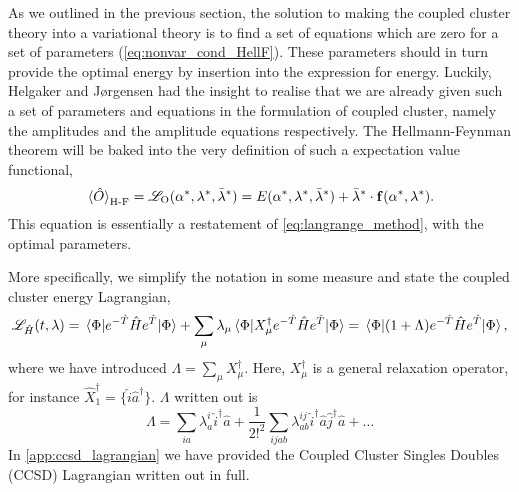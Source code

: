 As we outlined in the previous section, the solution to making the coupled cluster 
theory into a variational theory is to find a set of equations which are zero for a set
of parameters (\autoref{eq:nonvar_cond_HellF}). These parameters should in turn provide the optimal energy by insertion 
into the expression for energy. Luckily, Helgaker and 
Jørgensen\cite{helgaker1988analytical,helgaker1989configuration} had the insight to 
realise that we are already given such a set of parameters and equations in the 
formulation of coupled cluster, namely the amplitudes and the amplitude equations
respectively. The Hellmann-Feynman theorem will be baked into the very definition 
of such a expectation value functional,
\begin{equation}
    \ev*{\hat{O}}_{\text{H-F}} 
        = \mathscr{L}_{\text{O}}(\alpha^*, \vb{\lambda}^*, \bar{\vb{\lambda}}^*)
        = E(\alpha^*, \vb{\lambda}^*, \bar{\vb{\lambda}}^*)
        + \bar{\vb{\lambda}}^* \cdot \vb{f}(\alpha^*, \vb{\lambda}^*).
\end{equation}
This equation is essentially a restatement of \autoref{eq:langrange_method}, with  
the optimal parameters.

More specifically, we simplify the notation in some measure and state the coupled
cluster energy Lagrangian,
\begin{equation}
    \label{eq:cc_energy_lagrangian}
    \mathscr{L}_{\hat{H}}(t, \lambda) 
        = \mel{\Phi}{e^{-\hat{T}}\hat{H}e^{\hat{T}}}{\Phi}
        + \sum_\mu \lambda_\mu \mel{\Phi}{X_\mu^\dagger e^{-\hat{T}} \hat{H} e^{\hat{T}}}{\Phi}
        = \mel{\Phi}{(1 + \Lambda)e^{-\hat{T}}\hat{H}e^{\hat{T}} }{\Phi},
\end{equation}
where we have introduced $\Lambda = \sum_\mu X^\dagger_\mu$. Here, $X^\dagger_\mu$ is a
general relaxation operator, for instance $\hat{X}_1^\dagger = \{\hat{i}\hat{a}^\dagger\}$.
$\Lambda$ written out is 
\begin{equation}
    \label{eq:capital_lambda}
    \Lambda = \sum_{ia}\lambda^i_a \hat{i}^\dagger \hat{a}
    + \frac{1}{2!^2}\sum_{ijab} 
        \lambda^{ij}_{ab} \hat{i}^\dagger \hat{a} \hat{j}^\dagger \hat{a}
    + \dots
\end{equation}
In \autoref{app:ccsd_lagrangian} we have provided the Coupled Cluster 
Singles Doubles (CCSD) Lagrangian written out in full.

